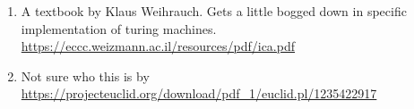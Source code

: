 \documentclass[a4paper,12pt]{article}
\begin{document}
	\begin{enumerate}
		\item A textbook by Klaus Weihrauch. Gets a little bogged down in specific implementation of turing machines. \url{https://eccc.weizmann.ac.il/resources/pdf/ica.pdf}
		\item Not sure who this is by \url{https://projecteuclid.org/download/pdf_1/euclid.pl/1235422917}
	\end{enumerate}
\end{document}

